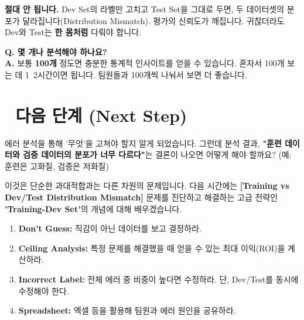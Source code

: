 \documentclass[11pt,a4paper]{book}
\theoremstyle{definition}
\begin{document}
\begin{warningbox}[title={Dev Set만 고치면 안 되나요?}]
\textbf{절대 안 됩니다.}
Dev Set의 라벨만 고치고 Test Set을 그대로 두면, 두 데이터셋의 분포가 달라집니다(Distribution Mismatch). 평가의 신뢰도가 깨집니다. 귀찮더라도 Dev와 Test는 \textbf{한 몸처럼} 다뤄야 합니다.
\end{warningbox}

\textbf{Q. 몇 개나 분석해야 하나요?} \\
\textbf{A.} 보통 \textbf{100개} 정도면 충분한 통계적 인사이트를 얻을 수 있습니다. 혼자서 100개 보는 데 1~2시간이면 됩니다. 팀원들과 100개씩 나눠서 보면 더 좋습니다.

\section*{🔗 다음 단계 (Next Step)}
에러 분석을 통해 '무엇'을 고쳐야 할지 알게 되었습니다.
그런데 분석 결과, \textbf{"훈련 데이터와 검증 데이터의 분포가 너무 다르다"}는 결론이 나오면 어떻게 해야 할까요? (예: 훈련은 고화질, 검증은 저화질)

이것은 단순한 과대적합과는 다른 차원의 문제입니다. 다음 시간에는 \textbf{[Training vs Dev/Test Distribution Mismatch]} 문제를 진단하고 해결하는 고급 전략인 \textbf{'Training-Dev Set'}의 개념에 대해 배우겠습니다.

\vspace{0.5cm}

\begin{summarybox}[title={단원 요약 (Cheat Sheet)}]
\begin{enumerate}
    \item \textbf{Don't Guess:} 직감이 아닌 데이터를 보고 결정하라.
    \item \textbf{Ceiling Analysis:} 특정 문제를 해결했을 때 얻을 수 있는 최대 이익(ROI)을 계산하라.
    \item \textbf{Incorrect Label:} 전체 에러 중 비중이 높다면 수정하라. 단, Dev/Test를 동시에 수정해야 한다.
    \item \textbf{Spreadsheet:} 엑셀 등을 활용해 팀원과 에러 원인을 공유하라.
\end{enumerate}
\end{summarybox}


\end{document}
